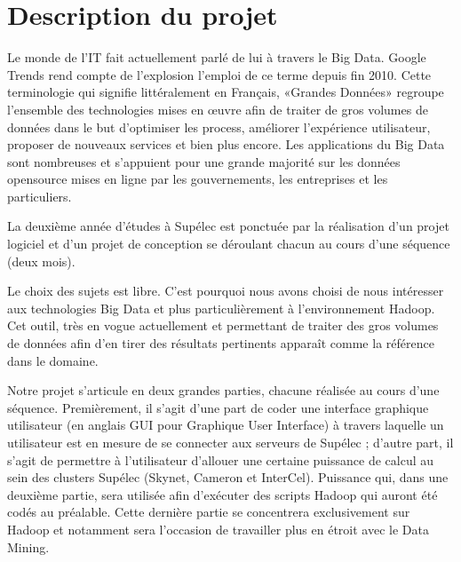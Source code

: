 \section{Description du projet}

\par Le monde de l’IT fait actuellement parlé de lui à travers le Big Data. Google Trends rend compte de l’explosion l’emploi de ce terme depuis fin 2010. Cette terminologie qui signifie littéralement en Français, «Grandes Données» regroupe l’ensemble des technologies mises en œuvre afin de traiter de gros volumes de données dans le but d’optimiser les process, améliorer l’expérience utilisateur, proposer de nouveaux services et bien plus encore. Les applications du Big Data sont nombreuses et s’appuient pour une grande majorité sur les données opensource mises en ligne par les gouvernements, les entreprises et les particuliers.

\par La deuxième année d’études à Supélec est ponctuée par la réalisation d’un projet logiciel et d’un projet de conception se déroulant chacun au cours d’une séquence (deux mois).

\par Le choix des sujets est libre. C’est pourquoi nous avons choisi de nous intéresser aux technologies Big Data et plus particulièrement à l’environnement Hadoop. Cet outil, très en vogue actuellement et permettant de traiter des gros volumes de données afin d’en tirer des résultats pertinents apparaît comme la référence dans le domaine. 

\par Notre projet s’articule en deux grandes parties, chacune réalisée au cours d’une séquence. Premièrement, il s’agit d’une part de coder une interface graphique utilisateur (en anglais GUI pour Graphique User Interface) à travers laquelle un utilisateur est en mesure de se connecter aux serveurs de Supélec ; d’autre part, il s’agit de permettre à l’utilisateur d’allouer une certaine puissance de calcul au sein des clusters Supélec (Skynet, Cameron et InterCel). Puissance qui, dans une deuxième partie, sera utilisée afin d’exécuter des scripts Hadoop qui auront été codés au préalable. Cette dernière partie se concentrera exclusivement sur Hadoop et notamment sera l’occasion de travailler plus en étroit avec le Data Mining.

